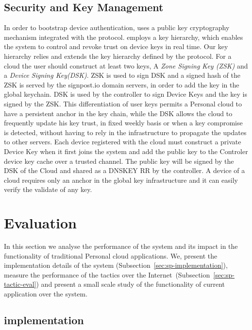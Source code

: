 \subsection{Security and Key Management} \label{signpost-security}

In order to bootstrap device authentication, \signpost uses a public key
cryptography mechanism integrated with the \dnssec protocol.  \signpost employs
a key hierarchy, which enables the system to control and revoke trust on device
keys in real time. Our key hierarchy relies and extends the key hierarchy
defined by the \dnssec protocol. For a \signpost cloud the user should construct
at least two keys, A {\it Zone Signing Key (ZSK)} and a {\it Device Signing
  Key(DSK)}. ZSK is used to sign DSK and a signed hash of the ZSK is served by
the signpost.io domain servers, in order to add the key in the global \dnssec
keychain. DSK is used by the controller to sign Device Keys and the key is
signed by the ZSK. This differentiation of user keys permits a Personal cloud to
have a persistent anchor in the \dnssec key chain, while the DSK allows the
cloud to frequently update his key trust, in fixed weekly basis or when a key
compromise is detected, without having to rely in the \dnssec infrastructure to
propagate the updates to other servers. Each device registered with the cloud
must construct a private Device Key when it first joins the system and add the
public key to the Controler device key cache over a trusted channel. The public
key will be signed by the DSK of the Cloud and shared as a DNSKEY RR by the
controller. A device of a \signpost cloud requires only an anchor in the global
\dnssec key infrastructure and it can easily verify the validate of any
\signpost key.  


\section{Evaluation}\label{sec:signpost-evaluation}

In this section we analyse the performance of the \signpost system and its
impact in the functionality of traditional Personal cloud applications. We,
 present the implementation details of the system
(Subsection~\ref{sec:sp-implementation}), measure the performance of the
\signpost tactics over the Internet~(Subsection~\ref{sec:sp-tactic-eval}) and
present a small scale study of the functionality of current application over the
\signpost system. 

\subsection{\signpost implementation}

